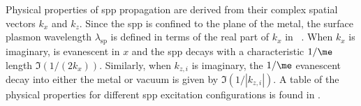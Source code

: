 Physical properties of \gls{spp} propagation are derived from their complex
spatial vectors $k_x$ and $k_z$.  Since the \gls{spp} is confined to the plane of
the metal, the surface plasmon wavelength $\lambda_\text{sp}$ is defined in
terms of the real part of $k_x$ in
~\cite{raether1997surface}.  When $k_x$ is imaginary,
 is evanescent in $x$ and the \gls{spp} decays with a
characteristic $1/\me$ length $\Im(1/(2k_x))$.  Similarly, when $k_{z,i}$
is imaginary, the $1/\me$ evanescent decay into either the metal or vacuum
is given by $\Im(1/|k_{z,i}|)$.  A table of the physical properties for
different \gls{spp} excitation configurations is found in
.
